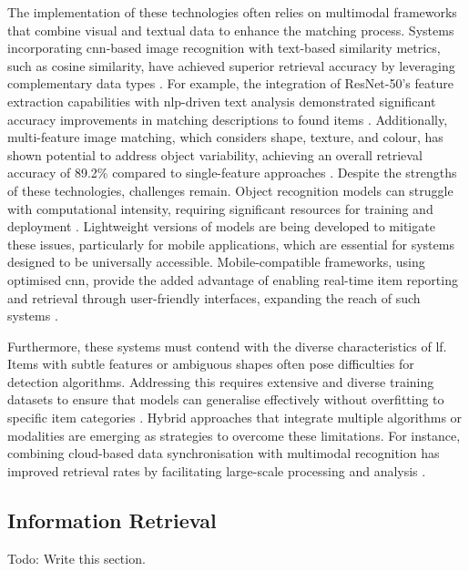 The implementation of these technologies often relies on multimodal frameworks that combine visual and textual data to enhance the matching process. Systems incorporating \ac{cnn}-based image recognition with text-based similarity metrics, such as cosine similarity, have achieved superior retrieval accuracy by leveraging complementary data types \cites{Prawira2024, Ghazal2016}. For example, the integration of ResNet-50's feature extraction capabilities with \ac{nlp}-driven text analysis demonstrated significant accuracy improvements in matching descriptions to found items \cites{Ghazal2016, Prawira2024}. Additionally, multi-feature image matching, which considers shape, texture, and colour, has shown potential to address object variability, achieving an overall retrieval accuracy of 89.2\% compared to single-feature approaches \cite{Ghazal2016}. Despite the strengths of these technologies, challenges remain. Object recognition models can struggle with computational intensity, requiring significant resources for training and deployment \cites{Lubna2021, Mezhenin2021}. Lightweight versions of models are being developed to mitigate these issues, particularly for mobile applications, which are essential for systems designed to be universally accessible. Mobile-compatible frameworks, using optimised \ac{cnn}, provide the added advantage of enabling real-time item reporting and retrieval through user-friendly interfaces, expanding the reach of such systems \cites{Stout2024, Ghazal2016}.

Furthermore, these systems must contend with the diverse characteristics of \ac{lf}. Items with subtle features or ambiguous shapes often pose difficulties for detection algorithms. Addressing this requires extensive and diverse training datasets to ensure that models can generalise effectively without overfitting to specific item categories \cites{Prawira2024, Liu2022, Sharma2024}. Hybrid approaches that integrate multiple algorithms or modalities are emerging as strategies to overcome these limitations. For instance, combining cloud-based data synchronisation with multimodal recognition has improved retrieval rates by facilitating large-scale processing and analysis \cite{Liu2024, Vedanth2024}.

\subsection{Information Retrieval} \label{subsec:information-retrieval}

Todo: Write this section.

